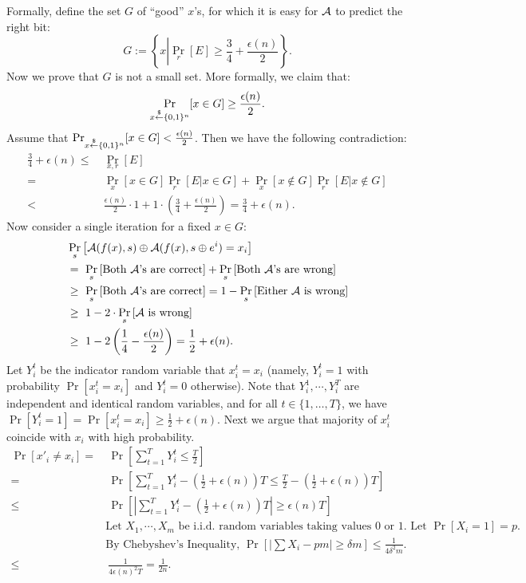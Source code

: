 Formally, define the set $G$ of ``good'' $x$'s, for which it is easy for $\mathcal{A}$ to predict the right bit:
$$G := \left\{x \left| \Pr_r \left[ E \right]\geq \frac{3}{4} + \frac{\epsilon(n)}{2} \right. \right\}.$$
Now we prove that $G$ is not a small set. More formally, we claim that:
$$\Pr_{x \stackrel{\$}{\leftarrow} \{0,1\}^{n}}[x \in G] \geq \frac{\epsilon(n)}{2}.$$
Assume that $\Pr_{x \stackrel{\$}{\leftarrow} \{0,1\}^{n}}[x \in G] < \frac{\epsilon(n)}{2}$. Then we have the following contradiction:
\begin{align*}
\frac{3}{4} + \epsilon(n) \leq&~ \Pr_{x,r}[E]\\
=&~ \Pr_x [x \in G] \Pr_{r}[E| x\in G] + \Pr_x [x \notin G] \Pr_{r}[E | x\notin G]\\
< &~ \frac{\epsilon(n)}{2} \cdot 1 + 1\cdot \left(\frac{3}{4}+\frac{\epsilon(n)}{2}\right)  = \frac{3}{4} + \epsilon(n).
\end{align*}
Now consider a single iteration for a fixed $x \in G$:
\begin{align*}
&\Pr_{s} \left[ \mathcal{A}(f(x), s) \oplus \mathcal{A}(f(x), s\oplus e^i) = x_i \right]\\
&=~ \Pr_{s} \left[ \text{Both $\mathcal{A}$'s are correct} \right] + \Pr_{s} \left[ \text{Both $\mathcal{A}$'s are wrong} \right]\\
&\geq~ \Pr_{s} \left[ \text{Both $\mathcal{A}$'s are correct} \right] = 1- \Pr_{s} \left[ \text{Either $\mathcal{A}$ is wrong} \right]\\
&\geq~ 1- 2\cdot\Pr_{s} \left[ \text{$\mathcal{A}$ is wrong} \right]\\
&\geq~ 1-2\left(\frac{1}{4} - \frac{\epsilon(n)}{2} \right) 
= \frac{1}{2} + \epsilon(n).
\end{align*}
Let $Y_i^t$ be the indicator random variable that $x_i^t = x_i$ (namely, $Y_i^t=1$ with probability $\Pr[x_i^t = x_i]$ and $Y_i^t=0$ otherwise).
Note that $Y_i^1, \cdots, Y_i^T$ are independent and identical random variables, and for all $t \in \{1,\ldots, T\}$, we have $\Pr[Y_i^t=1] = \Pr[x_i^t = x_i] \geq \frac{1}{2} + \epsilon(n)$.
Next we argue that majority of $x_i^t$ coincide with $x_i$ with high probability.
\begin{align*}
\Pr[x'_i \neq x_i]
=&~ \Pr\left[\sum_{t=1}^T Y_i^t \leq \frac{T}{2} \right]\\
=&~ \Pr\left[\sum_{t=1}^T  Y_i^t- \left(\frac{1}{2} + \epsilon(n) \right)T \leq \frac{T}{2} - \left(\frac{1}{2} + \epsilon(n) \right)T \right]\\
\leq&~ \Pr\left[ \left| \sum_{t=1}^T  Y_i^t- \left(\frac{1}{2} + \epsilon(n) \right)T \right| \geq \epsilon(n)T \right]\\
& \text{Let $X_1,\cdots,X_m$ be i.i.d. random variables taking values 0 or 1. Let $\Pr[X_i=1] = p$.}\\
& \text{By Chebyshev's Inequality, $\Pr\left[ \left| \sum X_i - pm \right| \geq \delta m \right] \leq \frac{1}{4\delta^2 m}$.}\\
\leq&~ \frac{1}{4\epsilon(n)^2T} = \frac{1}{2n}.
\end{align*}
